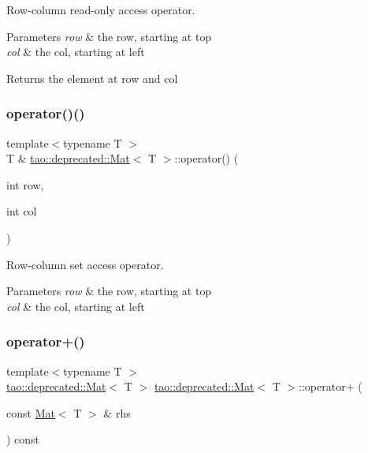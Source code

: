 Row-\/column read-\/only access operator. 


\begin{DoxyParams}{Parameters}
{\em row} & the row, starting at top \\
\hline
{\em col} & the col, starting at left \\
\hline
\end{DoxyParams}
\begin{DoxyReturn}{Returns}
the element at row and col 
\end{DoxyReturn}
\mbox{\label{classtao_1_1deprecated_1_1_mat_a9262e6fd8ccf2e3348a36155ade52331}} 
\subsubsection{\texorpdfstring{operator()()}{operator()()}\hspace{0.1cm}{\footnotesize\ttfamily [2/2]}}
{\footnotesize\ttfamily template$<$typename T $>$ \\
T \& \mbox{\hyperlink{classtao_1_1deprecated_1_1_mat}{tao\+::deprecated\+::\+Mat}}$<$ T $>$\+::operator() (\begin{DoxyParamCaption}\item[{int}]{row,  }\item[{int}]{col }\end{DoxyParamCaption})}



Row-\/column set access operator. 


\begin{DoxyParams}{Parameters}
{\em row} & the row, starting at top \\
\hline
{\em col} & the col, starting at left \\
\hline
\end{DoxyParams}
\mbox{\label{classtao_1_1deprecated_1_1_mat_a07638329cad1a6ff347c9917278dc421}} 
\subsubsection{\texorpdfstring{operator+()}{operator+()}}
{\footnotesize\ttfamily template$<$typename T $>$ \\
\mbox{\hyperlink{classtao_1_1deprecated_1_1_mat}{tao\+::deprecated\+::\+Mat}}$<$ T $>$ \mbox{\hyperlink{classtao_1_1deprecated_1_1_mat}{tao\+::deprecated\+::\+Mat}}$<$ T $>$\+::operator+ (\begin{DoxyParamCaption}\item[{const \mbox{\hyperlink{classtao_1_1deprecated_1_1_mat}{Mat}}$<$ T $>$ \&}]{rhs }\end{DoxyParamCaption}) const}



